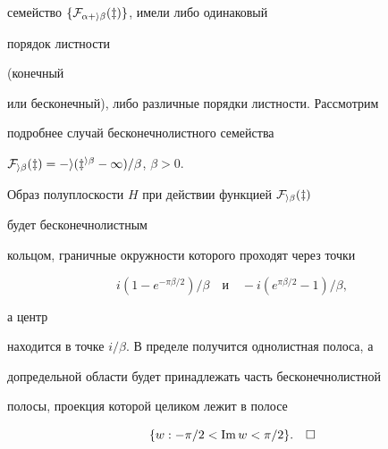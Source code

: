 семейство $\{\cal F_{\alpha+i\beta}(z)\}$, имели либо одинаковый 


порядок листности 


(конечный 


или бесконечный), либо различные порядки листности. Рассмотрим 


подробнее случай бесконечнолистного семейства 


$\cal F_{i\beta}(z)=-i(z^{i\beta}-1)/\beta$, $\beta>0$. 


 


Образ полуплоскости $H$ при действии функцией $\cal F_{i\beta}(z)$ 


будет бесконечнолистным 


кольцом, граничные окружности которого проходят через точки 


$$ 


i(1-e^{-\pi\beta/2})/\beta\quad 


\text{и} 


\quad -i(e^{\pi\beta/2}-1)/\beta, 


$$ 


а центр 


находится в точке $i/\beta$. В пределе получится однолистная полоса, а 


допредельной области будет принадлежать часть бесконечнолистной 


полосы, проекция которой целиком лежит в полосе 


$$ 


\{w:-\pi/2<\im w<\pi/2\}.\quad\square 


$$ 


 


